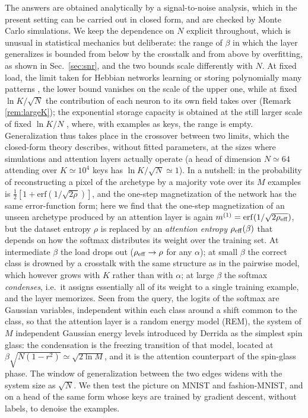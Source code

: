 \documentclass[11pt,a4paper]{article}
\newcommand{\erf}{\mathrm{erf}}
\begin{document}
The answers are obtained analytically by a signal-to-noise analysis, which in the present setting can be carried out in closed form, and are checked by Monte Carlo simulations. We keep the dependence on $N$ explicit throughout, which is unusual in statistical mechanics but deliberate: the range of $\beta$ in which the layer generalizes is bounded from below by the crosstalk and from above by overfitting, as shown in Sec.\ \ref{sec:snr}, and the two bounds scale differently with $N$. At fixed load, the limit taken for Hebbian networks learning or storing polynomially many patterns \cite{AGS1987,Alemanno2023,Agliari2023sup,Theriault2024}, the lower bound vanishes on the scale of the upper one, while at fixed $\ln K/\sqrt N$ the contribution of each neuron to its own field takes over (Remark \ref{rem:largeK}); the exponential storage capacity is obtained at the still larger scale of fixed $\ln K/N$ \cite{Demircigil2017,Lucibello2024}, where, with examples as keys, the range is empty. Generalization thus takes place in the crossover between two limits, which the closed-form theory describes, without fitted parameters, at the sizes where simulations and attention layers actually operate (a head of dimension $N\simeq64$ attending over $K\simeq10^4$ keys has $\ln K/\sqrt N\simeq1$). In a nutshell: in \cite{Alemanno2023} the probability of reconstructing a pixel of the archetype by a majority vote over its $M$ examples is $\frac12[1+\erf(1/\sqrt{2\rho})]$, and the one-step magnetization of the network has the same error-function form; here we find that the one-step magnetization of an unseen archetype produced by an attention layer is again $m^{(1)}=\erf(1/\sqrt{2\rho_{\rm eff}})$, but the dataset entropy $\rho$ is replaced by an \emph{attention entropy} $\rho_{\rm eff}(\beta)$ that depends on how the softmax distributes its weight over the training set. At intermediate $\beta$ the load drops out ($\rho_{\rm eff}\to\rho$ for any $\alpha$); at small $\beta$ the correct class is drowned by a crosstalk with the same structure as in the pairwise model, which however grows with $K$ rather than with $\alpha$; at large $\beta$ the softmax \emph{condenses}, i.e.\ it assigns essentially all of its weight to a single training example, and the layer memorizes. Seen from the query, the logits of the softmax are Gaussian variables, independent within each class around a shift common to the class, so that the attention layer is a random energy model (REM), the system of $M$ independent Gaussian energy levels introduced by Derrida \cite{Derrida1980,Derrida1981} as the simplest spin glass: the condensation is the freezing transition of that model, located at $\beta\sqrt{N(1-r^2)}\simeq\sqrt{2\ln M}$, and it is the attention counterpart of the spin-glass phase. The window of generalization between the two edges widens with the system size as $\sqrt N$. We then test the picture on MNIST and fashion-MNIST, and on a head of the same form whose keys are trained by gradient descent, without labels, to denoise the examples.
\end{document}
